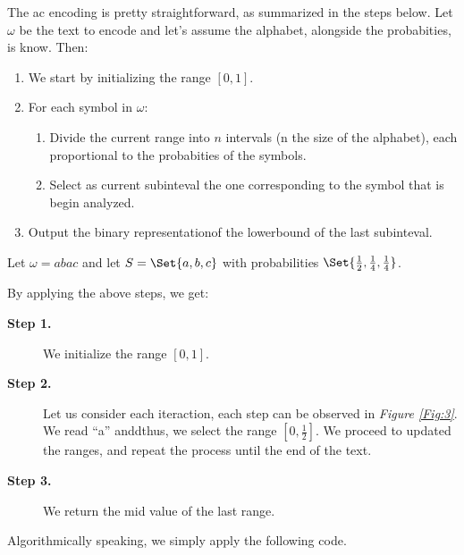\documentclass{subfiles}
\begin{document}
    The \gls{ac} encoding is pretty straightforward,
        as summarized in the steps below.
    Let \(\omega\) be the text to encode and let's assume the alphabet,
        alongside the probabities, is know. Then:
        \begin{enumerate}
            \item We start by initializing the range \([0, 1]\).
            \item For each symbol in \(\omega\):
                \begin{enumerate}
                    \item Divide the current range into \(n\) intervals 
                        (n the size of the alphabet), 
                        each proportional to the probabities of the symbols.
                    \item Select as current subinteval the one corresponding to the symbol
                        that is begin analyzed.
                \end{enumerate}
            \item Output the binary representation\footnotemark[1] of the lowerbound of the last subinteval.
        \end{enumerate}
        \begin{example*}
            Let \(\omega = abac\) and let \(S = \Set{a, b, c}\)
            with probabilities \(\Set{\tfrac{1}{2}, \tfrac{1}{4}, \tfrac{1}{4}}\).

            By applying the above steps, we get:
            \begin{description}
                \item [\textbf{Step 1.}] We initialize the range \([0, 1]\).
                \item [\textbf{Step 2.}] Let us consider each iteraction,
                    each step can be observed in \emph{Figure \ref{Fig:3}}.
                    We read ``a'' anddthus, we select the range \([0, \tfrac{1}{2}]\).
                    We proceed to updated the ranges, 
                    and repeat the process until the end of the text.
                    

                \item [\textbf{Step 3.}] We return the mid value of the last range.
            \end{description}
        \end{example*}
        Algorithmically speaking, we simply apply the following code.
        
\end{document}

